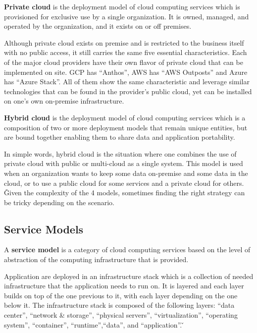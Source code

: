 \textbf{Private cloud} is the deployment model of cloud computing services which is provisioned for exclusive use by a
single organization. It is owned, managed, and operated by the organization, and it exists on or off premises.
\ed


Although private cloud exists on premise and is restricted to the business itself with no public access, it still
carries the same five essential characteristics. Each of the major cloud providers have their own flavor of private
cloud that can be implemented on site. GCP has ``Anthos'', AWS has ``AWS Outposts'' and Azure has ``Azure Stack''. All
of them show the same characteristic and leverage similar technologies that can be found in the provider's public cloud,
yet can be installed on one's own on-premise infrastructure.

\textbf{Hybrid cloud} is the deployment model of cloud computing services which is a composition of two or more
deployment models that remain unique entities, but are bound together enabling them to share data and application
portability.
\ed


In simple words, hybrid cloud is the situation where one combines the use of private cloud with public or multi-cloud
as a single system. This model is used when an organization wants to keep some data on-premise and some data in the
cloud, or to use a public cloud for some services and a private cloud for others. \v

Given the complexity of the 4 models, sometimes finding the right strategy can be tricky depending on the scenario.

\subsection{Service Models}

A \textbf{service model} is a category of cloud computing services based on the level of abstraction of the computing
infrastructure that is provided.
\ed

Application are deployed in an infrastructure stack which is a collection of needed infrastructure that the application
needs to run on. It is layered and each layer builds on top of the one previous to it, with each layer depending on the
one below it. The infrastructure stack is composed of the following layers: ``data center'', ``network \& storage'',
``physical servers'', ``virtualization'', ``operating system'', ``container'', ``runtime'',``data'', and ``application''.
\v

